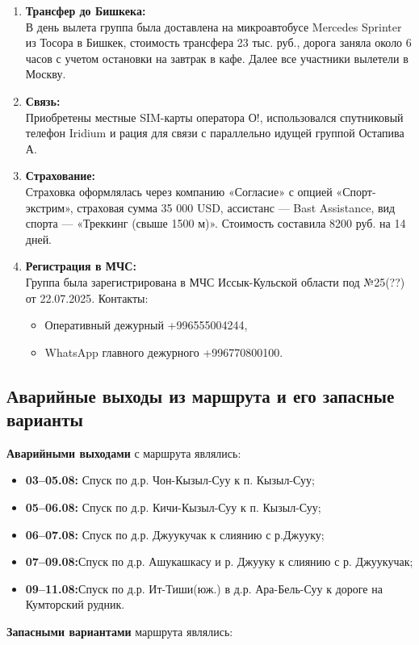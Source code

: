 \begin{enumerate}[]
Посёлок Тосор расположен на берегу озера Иссык-Куль, есть продуктовые магазины и кафе.
\item \textbf{Трансфер до Бишкека:}\\
В день вылета группа была доставлена на микроавтобусе Mercedes Sprinter из Тосора в Бишкек, стоимость трансфера 23 тыс. руб., дорога заняла около 6 часов с учетом остановки на завтрак в кафе.
Далее все участники вылетели в Москву.
\item \textbf{Связь:}\\
Приобретены местные SIM-карты оператора О!, использовался спутниковый телефон Iridium и рация для связи с параллельно идущей группой Остапива А.
\item \textbf{Страхование:}\\
Страховка оформлялась через компанию «Согласие» с опцией «Спорт-экстрим», страховая сумма 35 000 USD, ассистанс — Bast Assistance, вид спорта — «Треккинг (свыше 1500 м)». Стоимость составила 8200 руб. на 14 дней.
\item \textbf{Регистрация в МЧС:}\\
Группа была зарегистрирована в МЧС Иссык-Кульской области под №25(??) от 22.07.2025. Контакты:
\begin{itemize}[]\item Оперативный дежурный +996555004244, \item WhatsApp главного дежурного +996770800100.
\end{itemize}
\end{enumerate}

\subsection{Аварийные выходы из маршрута и его запасные варианты}

\textbf{Аварийными выходами} с маршрута являлись:
\begin{itemize}
	\item \textbf{03–05.08:} Спуск по д.р. Чон-Кызыл-Суу к п. Кызыл-Суу;
	\item \textbf{05–06.08:} Спуск по д.р. Кичи-Кызыл-Суу к п. Кызыл-Суу;
	\item \textbf{06–07.08:} Спуск по д.р. Джуукучак к слиянию с р.Джууку;
	\item \textbf{07–09.08:}Спуск по д.р. Ашукашкасу и р. Джууку к слиянию с р. Джуукучак;
	\item \textbf{09–11.08:}Спуск по д.р. Ит-Тиши(юж.) в д.р. Ара-Бель-Суу к дороге на Кумторский рудник.
	
	
\end{itemize}
\textbf{Запасными вариантами} маршрута являлись:

